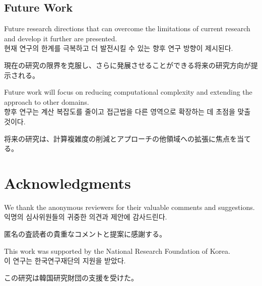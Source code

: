 \documentclass[preprint,12pt]{elsarticle}
\begin{document}
\subsection{Future Work}
Future research directions that can overcome the limitations of current research and develop it further are presented. \\
현재 연구의 한계를 극복하고 더 발전시킬 수 있는 향후 연구 방향이 제시된다. \\
\begin{CJK}{UTF8}{min}
現在の研究の限界を克服し、さらに発展させることができる将来の研究方向が提示される。
\end{CJK}

Future work will focus on reducing computational complexity and extending the approach to other domains. \\
향후 연구는 계산 복잡도를 줄이고 접근법을 다른 영역으로 확장하는 데 초점을 맞출 것이다. \\
\begin{CJK}{UTF8}{min}
将来の研究は、計算複雑度の削減とアプローチの他領域への拡張に焦点を当てる。
\end{CJK}

\section*{Acknowledgments}
We thank the anonymous reviewers for their valuable comments and suggestions. \\
익명의 심사위원들의 귀중한 의견과 제안에 감사드린다. \\
\begin{CJK}{UTF8}{min}
匿名の査読者の貴重なコメントと提案に感謝する。
\end{CJK}

This work was supported by the National Research Foundation of Korea. \\
이 연구는 한국연구재단의 지원을 받았다. \\
\begin{CJK}{UTF8}{min}
この研究は韓国研究財団の支援を受けた。
\end{CJK}



\end{document}
